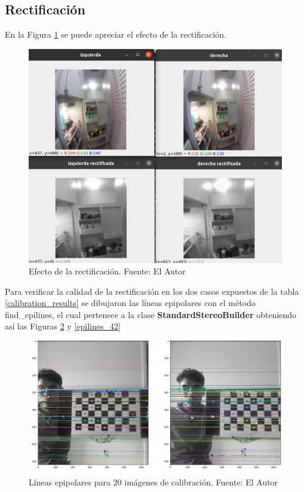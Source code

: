 \subsection{Rectificación}
En la Figura \ref{rectification_result} se puede apreciar el efecto de la rectificación.
\begin{figure}[H]
    \centering
    \includegraphics[scale=0.6]{Recursos/rectification_result.jpg}
    \caption[Efecto de la rectificación.]{Efecto de la rectificación. {\footnotesize Fuente: El Autor}}
    \label{rectification_result}
\end{figure}
Para verificar la calidad de la rectificación en los dos casos expuestos de la tabla \ref{calibration_results} se dibujaron las líneas epipolares con el método find\_epilines, el cual pertenece a la clase \textbf{StandardStereoBuilder} obteniendo así las Figuras \ref{epilines_20} y \ref{epilines_42}
\begin{figure}[H]
    \centering
    \includegraphics[scale=0.4]{Recursos/epilines_20_calibration_images.jpg}
    \caption[Líneas epipolares para 20 imágenes de calibración.]{Líneas epipolares para 20 imágenes de calibración. {\footnotesize Fuente: El Autor}}
    \label{epilines_20}
\end{figure}
